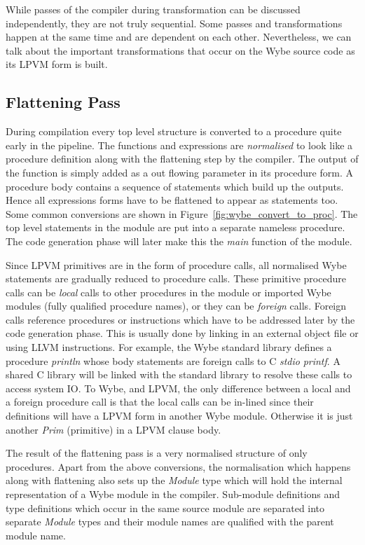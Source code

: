 While passes of the compiler during transformation can be discussed
independently, they are not truly sequential. Some passes and transformations
happen at the same time and are dependent on each other. Nevertheless, we can
talk about the important transformations that occur on the Wybe source code as
its LPVM form is built.

\subsection{Flattening Pass}

During compilation every top level structure is converted to a procedure quite
early in the pipeline. The functions and expressions are \textit{normalised} to
look like a procedure definition along with the flattening step by the
compiler. The output of the function is simply added as a out flowing parameter
in its procedure form. A procedure body contains a sequence of statements which
build up the outputs. Hence all expressions forms have to be flattened to
appear as statements too. Some common conversions are shown in
Figure~\ref{fig:wybe_convert_to_proc}. The top level statements in the module
are put into a separate nameless procedure. The code generation phase will
later make this the \textit{main} function of the module.

Since LPVM primitives are in the form of procedure calls, all normalised Wybe
statements are gradually reduced to procedure calls. These primitive procedure
calls can be \textit{local} calls to other procedures in the module or imported
Wybe modules (fully qualified procedure names), or they can be \textit{foreign}
calls. Foreign calls reference procedures or instructions which have to be
addressed later by the code generation phase. This is usually done by linking
in an external object file or using LLVM instructions. For example, the Wybe
standard library defines a procedure \textit{println} whose body statements are
foreign calls to C \textit{stdio} \textit{printf}. A shared C library will be
linked with the standard library to resolve these calls to access system IO. To
Wybe, and LPVM, the only difference between a local and a foreign procedure
call is that the local calls can be in-lined since their definitions will have
a LPVM form in another Wybe module. Otherwise it is just another \textit{Prim}
(primitive) in a LPVM clause body.

The result of the flattening pass is a very normalised structure of only
procedures. Apart from the above conversions, the normalisation which happens
along with flattening also sets up the \textit{Module} type which will hold the
internal representation of a Wybe module in the compiler. Sub-module
definitions and type definitions which occur in the same source module are
separated into separate \textit{Module} types and their module names are
qualified with the parent module name.

